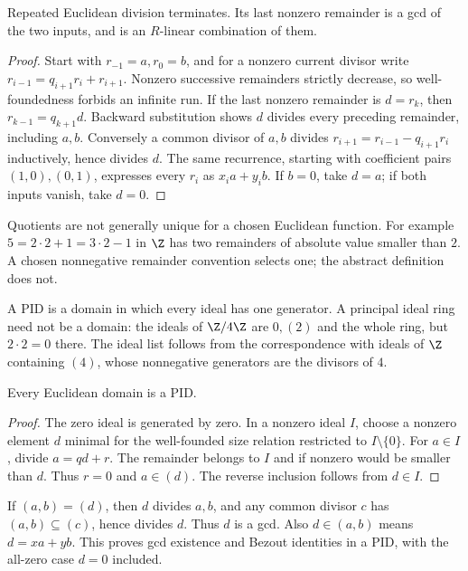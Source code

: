 \begin{theorem}\label{thm:euclidean-algorithm}
Repeated Euclidean division terminates. Its last nonzero remainder is
a gcd of the two inputs, and is an $R$-linear combination of them.
\end{theorem}
\begin{proof}
Start with $r_{-1}=a,r_0=b$, and for a nonzero current divisor write
$r_{i-1}=q_{i+1}r_i+r_{i+1}$. Nonzero successive remainders strictly
decrease, so well-foundedness forbids an infinite run. If the last
nonzero remainder is $d=r_k$, then $r_{k-1}=q_{k+1}d$.
Backward substitution shows $d$ divides every preceding remainder,
including $a,b$. Conversely a common divisor of $a,b$ divides
$r_{i+1}=r_{i-1}-q_{i+1}r_i$ inductively, hence divides $d$.
The same recurrence, starting with coefficient pairs $(1,0),(0,1)$,
expresses every $r_i$ as $x_i a+y_i b$.
If $b=0$, take $d=a$; if both inputs vanish, take $d=0$.
\end{proof}
Quotients are not generally unique for a chosen Euclidean function.
For example $5=2\cdot2+1=3\cdot2-1$ in $\Z$ has two remainders of
absolute value smaller than $2$. A chosen nonnegative remainder convention
selects one; the abstract definition does not.

A PID is a domain in which every ideal has one generator.
A principal ideal ring need not be a domain: the ideals of $\Z/4\Z$
are $0,(2)$ and the whole ring, but $2\cdot2=0$ there.
The ideal list follows from the correspondence with ideals of $\Z$
containing $(4)$, whose nonnegative generators are the divisors of $4$.

\begin{theorem}\label{thm:euclidean-implies-pid}
Every Euclidean domain is a PID.
\end{theorem}
\begin{proof}
The zero ideal is generated by zero. In a nonzero ideal $I$, choose a
nonzero element $d$ minimal for the well-founded size relation restricted
to $I\setminus\{0\}$. For $a\in I$, divide $a=qd+r$.
The remainder belongs to $I$ and if nonzero would be smaller than $d$.
Thus $r=0$ and $a\in(d)$. The reverse inclusion follows from $d\in I$.
\end{proof}

If $(a,b)=(d)$, then $d$ divides $a,b$, and any common divisor $c$
has $(a,b)\subseteq(c)$, hence divides $d$. Thus $d$ is a gcd.
Also $d\in(a,b)$ means $d=xa+yb$.
This proves gcd existence and Bezout identities in a PID, with
the all-zero case $d=0$ included.

